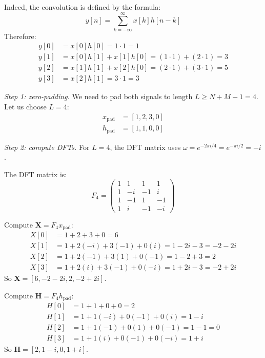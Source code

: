 \begin{notechapter}
\begin{example}
Indeed, the convolution is defined by the formula:
\[
y[n] = \sum_{k=-\infty}^{\infty} x[k]h[n-k]
\]
Therefore:
\begin{align*}
    y[0] &= x[0]h[0] = 1 \cdot 1 = 1 \\
    y[1] &= x[0]h[1] + x[1]h[0] = (1 \cdot 1) + (2 \cdot 1) = 3 \\
    y[2] &= x[1]h[1] + x[2]h[0] = (2 \cdot 1) + (3 \cdot 1) = 5 \\
    y[3] &= x[2]h[1] = 3 \cdot 1 = 3
\end{align*}


\vspace{0.3cm}
\emph{Step 1: zero-padding.}
We need to pad both signals to length $L \geq N + M - 1 = 4$. Let us choose $L = 4$:
\begin{align*}
x_{\text{pad}} &= [1, 2, 3, 0] \\
h_{\text{pad}} &= [1, 1, 0, 0]
\end{align*}

\vspace{0.3cm}
\emph{Step 2: compute DFTs.}
For $L=4$, the DFT matrix uses $\omega = e^{-2\pi i/4} = e^{-\pi i/2} = -i$.

The DFT matrix is:
\[
F_4 = \begin{pmatrix}
1 & 1 & 1 & 1 \\
1 & -i & -1 & i \\
1 & -1 & 1 & -1 \\
1 & i & -1 & -i
\end{pmatrix}
\]

Compute $\mathbf{X} = F_4 x_{\text{pad}}$:
\begin{align*}
X[0] &= 1 + 2 + 3 + 0 = 6 \\
X[1] &= 1 + 2(-i) + 3(-1) + 0(i) = 1 - 2i - 3 = -2 - 2i \\
X[2] &= 1 + 2(-1) + 3(1) + 0(-1) = 1 - 2 + 3 = 2 \\
X[3] &= 1 + 2(i) + 3(-1) + 0(-i) = 1 + 2i - 3 = -2 + 2i
\end{align*}
So $\mathbf{X} = [6, -2-2i, 2, -2+2i]$.

Compute $\mathbf{H} = F_4 h_{\text{pad}}$:
\begin{align*}
H[0] &= 1 + 1 + 0 + 0 = 2 \\
H[1] &= 1 + 1(-i) + 0(-1) + 0(i) = 1 - i \\
H[2] &= 1 + 1(-1) + 0(1) + 0(-1) = 1 - 1 = 0 \\
H[3] &= 1 + 1(i) + 0(-1) + 0(-i) = 1 + i
\end{align*}
So $\mathbf{H} = [2, 1-i, 0, 1+i]$.


\end{example}
\end{notechapter}
